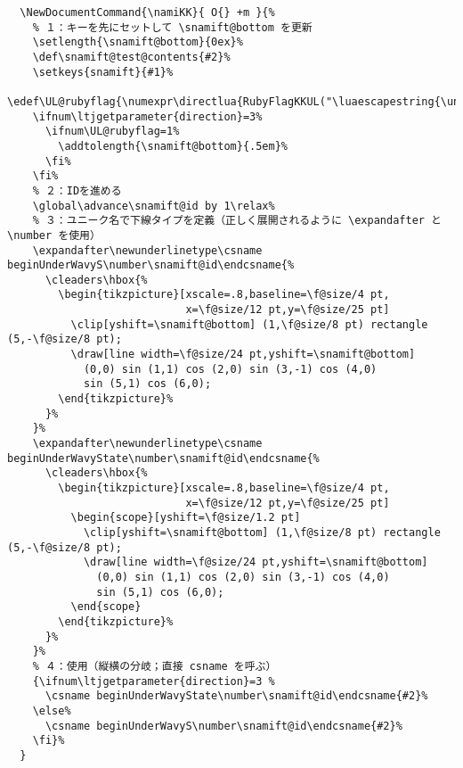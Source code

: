 \documentclass[luatex,fontsize=8pt,paper=b5,twoside]{jlreq}%
\begin{document}
\begin{lstlisting}
  \NewDocumentCommand{\namiKK}{ O{} +m }{%
    % １：キーを先にセットして \snamift@bottom を更新
    \setlength{\snamift@bottom}{0ex}%
    \def\snamift@test@contents{#2}%
    \setkeys{snamift}{#1}%
    \edef\UL@rubyflag{\numexpr\directlua{RubyFlagKKUL("\luaescapestring{\unexpanded\expandafter{\snamift@test@contents}}")}\relax}%
    \ifnum\ltjgetparameter{direction}=3%
      \ifnum\UL@rubyflag=1%
        \addtolength{\snamift@bottom}{.5em}%
      \fi%
    \fi%
    % ２：IDを進める
    \global\advance\snamift@id by 1\relax%
    % ３：ユニーク名で下線タイプを定義（正しく展開されるように \expandafter と \number を使用）
    \expandafter\newunderlinetype\csname beginUnderWavyS\number\snamift@id\endcsname{%
      \cleaders\hbox{%
        \begin{tikzpicture}[xscale=.8,baseline=\f@size/4 pt,
                            x=\f@size/12 pt,y=\f@size/25 pt]
          \clip[yshift=\snamift@bottom] (1,\f@size/8 pt) rectangle (5,-\f@size/8 pt);
          \draw[line width=\f@size/24 pt,yshift=\snamift@bottom]
            (0,0) sin (1,1) cos (2,0) sin (3,-1) cos (4,0)
            sin (5,1) cos (6,0);
        \end{tikzpicture}%
      }%
    }%
    \expandafter\newunderlinetype\csname beginUnderWavyState\number\snamift@id\endcsname{%
      \cleaders\hbox{%
        \begin{tikzpicture}[xscale=.8,baseline=\f@size/4 pt,
                            x=\f@size/12 pt,y=\f@size/25 pt]
          \begin{scope}[yshift=\f@size/1.2 pt]
            \clip[yshift=\snamift@bottom] (1,\f@size/8 pt) rectangle (5,-\f@size/8 pt);
            \draw[line width=\f@size/24 pt,yshift=\snamift@bottom]
              (0,0) sin (1,1) cos (2,0) sin (3,-1) cos (4,0)
              sin (5,1) cos (6,0);
          \end{scope}
        \end{tikzpicture}%
      }%
    }%
    % ４：使用（縦横の分岐；直接 csname を呼ぶ）
    {\ifnum\ltjgetparameter{direction}=3 %
      \csname beginUnderWavyState\number\snamift@id\endcsname{#2}%
    \else%
      \csname beginUnderWavyS\number\snamift@id\endcsname{#2}%
    \fi}%
  }


\end{lstlisting}
\end{document}
